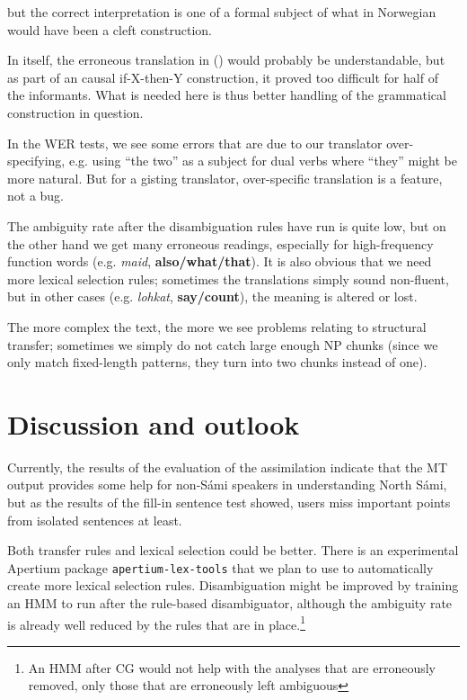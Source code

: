 but the correct interpretation is one of a formal subject of
what in Norwegian would have been a cleft construction.

In itself, the erroneous translation in () would probably be
understandable, but as part of an causal if-X-then-Y construction, it
proved too difficult for half of the informants. What is needed here
is thus better handling of the grammatical construction in question.

In the WER tests, we see some errors that are due to our translator
over-specifying, e.g. using ``the two'' as a subject for dual verbs
where ``they'' might be more natural. But for a gisting translator,
over-specific translation is a feature, not a bug.

The ambiguity rate after the disambiguation rules have run is quite
low, but on the other hand we get many erroneous readings, especially
for high-frequency function words (e.g. \textit{maid},
\textbf{also/what/that}). It is also obvious that we need more lexical
selection rules; sometimes the translations simply sound non-fluent,
but in other cases (e.g. \textit{lohkat}, \textbf{say/count}), the
meaning is altered or lost.

The more complex the text, the more we see problems relating to
structural transfer; sometimes we simply do not catch large enough NP
chunks (since we only match fixed-length patterns, they turn into two
chunks instead of one).


\section{Discussion and outlook}
Currently, the results of the evaluation of the assimilation indicate
that the MT output provides some help for non-S\'{a}mi speakers in
understanding North S\'{a}mi, but as the results of the fill-in sentence
test showed, users miss important points from isolated sentences at
least.

Both transfer rules and lexical selection could be better. There is an
experimental Apertium package \texttt{apertium-lex-tools} that we plan
to use to automatically create more lexical selection rules.
Disambiguation might be improved by training an HMM to run after the
rule-based disambiguator, although the ambiguity rate is already well
reduced by the rules that are in place.\footnote{An HMM after CG would
  not help with the analyses that are erroneously removed, only those
  that are erroneously left ambiguous}

